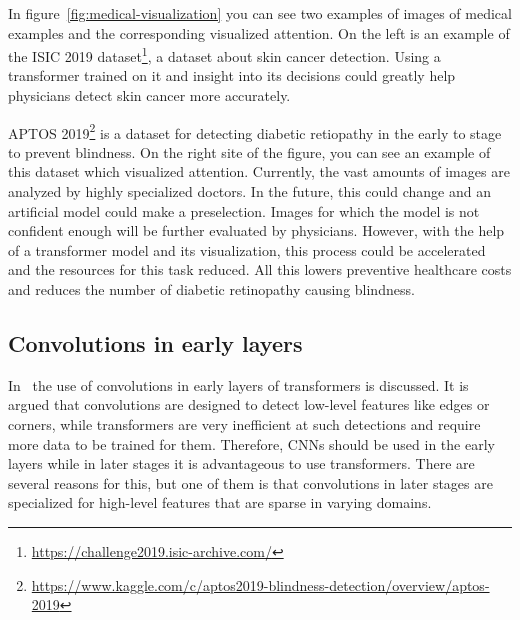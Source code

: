 \documentclass[a4paper]{scrartcl}
\begin{document}
    In figure~\ref{fig:medical-visualization} you can see two examples of images of medical examples and the corresponding visualized attention.
    On the left is an example of the ISIC 2019 dataset\footnote{\href{https://challenge2019.isic-archive.com/}{https://challenge2019.isic-archive.com/}}, a dataset about skin cancer detection.
    Using a transformer trained on it and insight into its decisions could greatly help physicians detect skin cancer more accurately.

    APTOS 2019\footnote{\href{ihttps://www.kaggle.com/c/aptos2019-blindness-detection/overview/aptos-2019}{https://www.kaggle.com/c/aptos2019-blindness-detection/overview/aptos-2019}} is a dataset for detecting diabetic retiopathy in the early to stage to prevent blindness.
    On the right site of the figure, you can see an example of this dataset which visualized attention.
    Currently, the vast amounts of images are analyzed by highly specialized doctors.
    In the future, this could change and an artificial model could make a preselection.
    Images for which the model is not confident enough will be further evaluated by physicians.
    However, with the help of a transformer model and its visualization, this process could be accelerated and the resources for this task reduced.
    All this lowers preventive healthcare costs and reduces the number of diabetic retinopathy causing blindness.

    \subsection{Convolutions in early layers}\label{subsec:convolutions-in-early-layers}
    In~\cite{wu2021visual} the use of convolutions in early layers of transformers is discussed.
    It is argued that convolutions are designed to detect low-level features like edges or corners, while transformers are very inefficient at such detections and require more data to be trained for them.
    Therefore, CNNs should be used in the early layers while in later stages it is advantageous to use transformers.
    There are several reasons for this, but one of them is that convolutions in later stages are specialized for high-level features that are sparse in varying domains.
\end{document}
